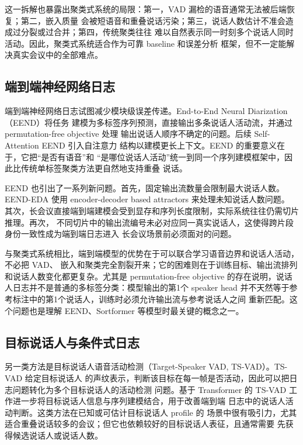 \documentclass[UTF8,a4paper,10pt]{ctexart}
\begin{document}
这一拆解也暴露出聚类式系统的局限：第一，VAD 漏检的语音通常无法被后端恢复；第二，嵌入质量
会被短语音和重叠说话污染；第三，说话人数估计不准会造成过分裂或过合并；第四，传统聚类往往
难以自然表示同一时刻多个说话人同时活动。因此，聚类式系统适合作为可靠 baseline 和误差分析
框架，但不一定能解决真实会议中的全部难点。

\subsection{端到端神经网络日志}

端到端神经网络日志试图减少模块级误差传递。End-to-End Neural Diarization（EEND）将任务
建模为多标签序列预测，直接输出多条说话人活动流，并通过 permutation-free objective 处理
输出说话人顺序不确定的问题\cite{fujita2019eend}。后续 Self-Attention EEND 引入自注意力
结构以建模更长上下文\cite{fujita2019saeend}。EEND 的重要意义在于，它把“是否有语音”和
“是哪位说话人活动”统一到同一个序列建模框架中，因此比传统单标签聚类方法更自然地支持重叠
说话。

EEND 也引出了一系列新问题。首先，固定输出流数量会限制最大说话人数。EEND-EDA 使用
encoder-decoder based attractors 来处理未知说话人数问题\cite{horiguchi2020eendeda}。
其次，长会议直接端到端建模会受到显存和序列长度限制，实际系统往往仍需切片推理。再次，
不同切片中的输出流编号未必对应同一真实说话人，这使得跨片段身份一致性成为端到端日志进入
长会议场景前必须面对的问题。

与聚类式系统相比，端到端模型的优势在于可以联合学习语音边界和说话人活动，不必把 VAD、
嵌入和聚类完全割裂开来；它的困难则在于训练目标、输出流排列和说话人数变化都更复杂。尤其是
permutation-free objective 的存在说明，说话人日志并不是普通的多标签分类：模型输出的第1个
speaker head 并不天然等于参考标注中的第1个说话人，训练时必须允许输出流与参考说话人之间
重新匹配。这个问题也是理解 EEND、Sortformer 等模型时最关键的概念之一。

\subsection{目标说话人与条件式日志}

另一类方法是目标说话人语音活动检测（Target-Speaker VAD, TS-VAD）。TS-VAD 给定目标说话人
的声纹表示，判断该目标在每一帧是否活动，因此可以把日志问题转化为多个目标说话人的活动检测
问题。基于 Transformer 的 TS-VAD 工作进一步将目标说话人信息与序列建模结合，用于改善端到端
日志中的说话人活动判断\cite{wang2022tsvad}。这类方法在已知或可估计目标说话人 profile 的
场景中很有吸引力，尤其适合重叠说话较多的会议；但它也依赖较好的目标说话人表征，且通常需要
先获得候选说话人或说话人数。
\end{document}
